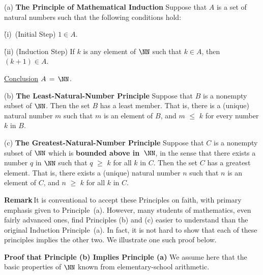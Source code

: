 \V

\hspace*{\parindent} (a) {\bf The Principle of Mathematical Induction}
    Suppose that $A$ is a set of natural numbers such that the following conditions hold:

        \h (i)\, (Initial Step) $1{\in}A$.

        \h (ii) (Induction Step) If $k$ is any element of ${\NN}$ such that $k{\in}A$, then $(k+1){\in}A$.

\noindent \underline{Conclusion} $A \,=\, {\NN}$.

\V

        (b) {\bf The Least-Natural-Number Principle}
    Suppose that $B$ is a nonempty subset of ${\NN}$. Then the set $B$ has a least member.
    That is, there is a (unique) natural number $m$ such that $m$ is an element of $B$, and $m\,\,{\leq}\,\,k$ for every number $k$ in $B$.

\V

        (c) {\bf The Greatest-Natural-Number Principle} Suppose that $C$ is a nonempty subset of ${\NN}$
    which is {\bf bounded above in~${\NN}$}, in the sense that there exists a number $q$ in ${\NN}$ such that $q\,\,{\geq}\,\,k$ for all $k$ in $C$.
    Then the set $C$ has a greatest element.
 That is, there exists a (unique) natural number $n$ such that $n$ is an element of $C$, and $n\,\,{\geq}\,\,k$ for all $k$ in $C$.

\V


        {\bf Remark}\,It is conventional to accept these Principles on faith, with primary emphasis given to Principle~(a).
    However, many students of mathematics, even fairly advanced ones, find Principles (b) and (c) easier to understand than the original Induction Principle~(a).
    In fact, it is not hard to show that each of these principles implies the other two. We illustrate one such proof below.

\V

        {\bf Proof that Principle (b) Implies Principle (a)} We assume here that the basic properties of ${\NN}$ known from elementary-school arithmetic.

